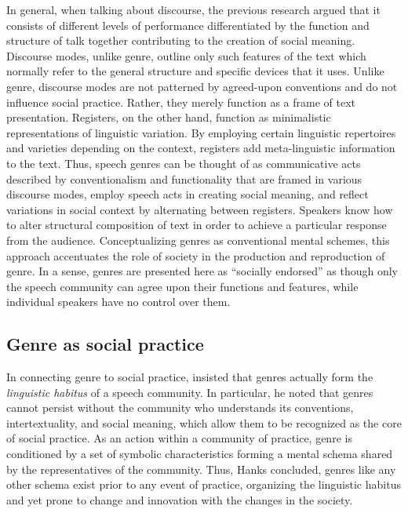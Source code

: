 \documentclass[12pt]{article}
\begin{document}
In general, when talking about discourse, the previous research argued that it consists of different levels of performance differentiated by the function and structure of talk together contributing to the creation of social meaning. Discourse modes, unlike genre, outline only such features of the text which normally refer to the general structure and specific devices that it uses. Unlike genre, discourse modes are not patterned by agreed-upon conventions and do not influence social practice. Rather, they merely function as a frame of text presentation. Registers, on the other hand, function as minimalistic representations of linguistic variation. By employing certain linguistic repertoires and varieties depending on the context, registers add meta-linguistic information to the text. Thus, speech genres can be thought of as communicative acts described by conventionalism and functionality that are framed in various discourse modes, employ speech acts in creating social meaning, and reflect variations in social context by alternating between registers. Speakers know how to alter structural composition of text in order to achieve a particular response from the audience. Conceptualizing genres as conventional mental schemes, this approach accentuates the role of society in the production and reproduction of genre. In a sense, genres are presented here as ``socially endorsed'' \parencite[p. 60]{bax2011} as though only the speech community can agree upon their functions and features, while individual speakers have no control over them.  
\subsection{Genre as social practice}
In connecting genre to social practice, \textcite{hanks1987} insisted that genres actually form the \textit{linguistic habitus} of a speech community. In particular, he noted that genres cannot persist without the community who understands its conventions, intertextuality, and social meaning, which allow them to be recognized as the core of social practice. As an action within a community of practice, genre is conditioned by a set of symbolic characteristics forming a mental schema shared by the representatives of the community. Thus, Hanks concluded, genres like any other schema exist prior to any event of practice, organizing the linguistic habitus and yet prone to change and innovation with the changes in the society.
\end{document}
